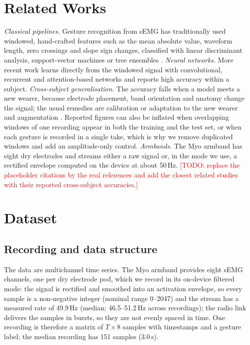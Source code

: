 \documentclass[conference]{IEEEtran}
\begin{document}
\section{Related Works}
\label{sec:related}
\emph{Classical pipelines.} Gesture recognition from sEMG has traditionally used
windowed, hand-crafted features such as the mean absolute value, waveform length,
zero crossings and slope sign changes, classified with linear discriminant analysis,
support-vector machines or tree ensembles \cite{TODO_ml_emg}. \emph{Neural
networks.} More recent work learns directly from the windowed signal with
convolutional, recurrent and attention-based networks \cite{TODO_dl_emg} and reports
high accuracy within a subject. \emph{Cross-subject generalisation.} The accuracy
falls when a model meets a new wearer, because electrode placement, band orientation
and anatomy change the signal; the usual remedies are calibration or adaptation to
the new wearer and augmentation \cite{TODO_inter_subject}. Reported figures can also
be inflated when overlapping windows of one recording appear in both the training
and the test set, or when each gesture is recorded in a single take, which is why we
remove duplicated windows and add an amplitude-only control.
\emph{Armbands.} The Myo armband \cite{TODO_myo_armband} has eight dry electrodes
and streams either a raw signal or, in the mode we use, a rectified envelope
computed on the device at about 50\,Hz.
\textcolor{red}{[TODO: replace the placeholder citations by the real references and
add the closest related studies with their reported cross-subject accuracies.]}
\section{Dataset}
\label{sec:dataset}
\subsection{Recording and data structure}
The data are multichannel time series. The Myo armband provides eight sEMG
channels, one per dry electrode pod, which we record in its on-device filtered
mode: the signal is rectified and smoothed into an activation envelope, so
every sample is a non-negative integer (nominal range 0--2047) and the stream
has a measured rate of 49.9\,Hz (median; 46.5--51.2\,Hz across recordings);
the radio link delivers the samples in bursts, so they are not evenly spaced
in time.
One recording is therefore a matrix of $T \times 8$ samples with timestamps and
a gesture label; the median recording has 151 samples (3.0\,s).
\end{document}
